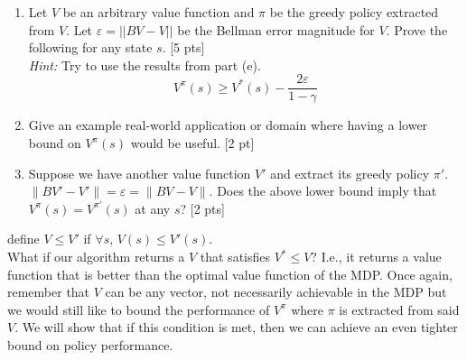 \documentclass[11pt]{article}
\let\epsilon\varepsilon
\begin{document}
\begin{enumerate}
    \item[(f)] Let $V$ be an arbitrary value function and $\pi$ be the greedy policy extracted from $V$. Let $\epsilon = ||BV-V||$ be the Bellman error magnitude for $V$. Prove the following for any state $s$. [5 pts]\\
    \textit{Hint:} Try to use the results from part (e).
    \begin{equation}
        V^\pi(s) \geq V^*(s) - \frac{2\epsilon}{1-\gamma}
    \end{equation}

    \begin{tcolorbox}[breakable]

    \end{tcolorbox}
    \newpage
    \item[(g)] Give an example real-world application or domain where having a lower bound on $V^\pi(s)$ would be useful. [2 pt]
    
    \begin{tcolorbox}[breakable]

    \end{tcolorbox}\newpage

    \item[(h)] Suppose we have another value function $V'$ and extract its greedy policy $\pi'$.  $\|B V' - V' \| = \epsilon = \|B V - V\|$. Does the above lower bound imply that $V^\pi(s) = V^{\pi'}(s)$ at any $s$? [2 pts]
    
    \begin{tcolorbox}[breakable]

    \end{tcolorbox}

\end{enumerate}


\newpage
{} define $V \leq V'$ if $\forall s$, $V(s) \leq V'(s)$. 
\\

\noindent What if our algorithm returns a $V$ that satisfies $V^* \leq V$? I.e., it returns a value function that is better than the optimal value function of the MDP. Once again, remember that $V$ can be any vector, not necessarily achievable in the MDP but we would still like to bound the performance of $V^\pi$ where $\pi$ is extracted from said $V$. We will show that if this condition is met, then we can achieve an even tighter bound on policy performance.
\end{document}
